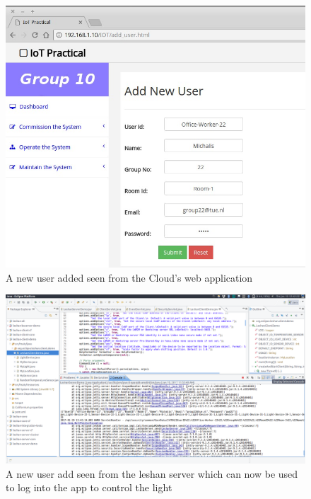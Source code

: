 \documentclass[11pt]{article}
\begin{document}
\begin{figure}[h!]
	\begin{center}
		\includegraphics[width=.6\linewidth]{img/newUserCloud}
		\caption{A new user added seen from the Cloud's web application}
		\label{fig:newuser}
	\end{center}
\end{figure}
\begin{figure}[h!]
	\begin{center}
		\includegraphics[width=\linewidth]{img/newUser}
		\caption{A new user add seen from the leshan server which can now be used to log into the app to control the light}
		\label{fig:newusercloud}
	\end{center}
\end{figure}

\newpage
\printbibliography
\end{document}
